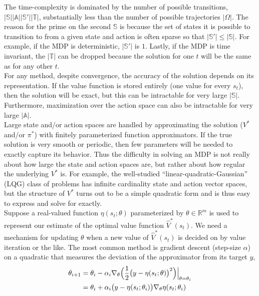 The time-complexity is dominated by the number of possible transitions, $|\mathbb{S}||\mathbb{A}||\mathbb{S}'||\mathbb{T}|$, substantially less than the number of possible trajectories $|\Omega|$. The reason for the prime on the second $\mathbb{S}$ is because the set of states it is possible to transition to from a given state and action is often sparse so that $|\mathbb{S}'| \leq |\mathbb{S}|$. For example, if the MDP is deterministic, $|\mathbb{S}'|$ is $1$. Lastly, if the MDP is time invariant, the $|\mathbb{T}|$ can be dropped because the solution for one $t$ will be the same as for any other $t$.\\

For any method, despite convergence, the accuracy of the solution depends on its representation. If the value function is stored entirely (one value for every $s_t$), then the solution will be exact, but this can be intractable for very large $|\mathbb{S}|$. Furthermore, maximization over the action space can also be intractable for very large $|\mathbb{A}|$.\\

Large state and/or action spaces are handled by approximating the solution ($V^*$ and/or $\pi^*$) with finitely parameterized function approximators. If the true solution is very smooth or periodic, then few parameters will be needed to exactly capture its behavior. Thus the difficulty in solving an MDP is not really about how large the state and action spaces are, but rather about how regular the underlying $V^*$ is. For example, the well-studied ``linear-quadratic-Gaussian'' (LQG) class of problems has infinite cardinality state and action vector spaces, but the structure of $V^*$ turns out to be a simple quadratic form and is thus easy to express and solve for exactly.\\

Suppose a real-valued function $\eta(s_t;\theta)$ parameterized by $\theta \in \mathbb{R}^m$ is used to represent our estimate of the optimal value function $\hat{V}^*(s_t)$. We need a mechanism for updating $\theta$ when a new value of $\hat{V}^*(s_t)$ is decided on by value iteration or the like. The most common method is gradient descent (step-size $\alpha$) on a quadratic that measures the deviation of the approximator from its target $y$,
\begin{align*}
\theta_{i+1} &= \theta_i - \alpha_i \nabla_{\theta}\Big{(}\dfrac{1}{2}\big{(}y - \eta(s_t;\theta)\big{)}^2\Big{)}\Big{|}_{\theta=\theta_i}\\
&= \theta_i + \alpha_i \big{(}y - \eta(s_t;\theta_i)\big{)}\nabla_{\theta}\eta(s_t;\theta_i)
\end{align*}

